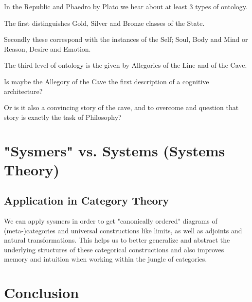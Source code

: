 \documentclass[12pt,a4paper]{article}
\begin{document}
In the Republic and Phaedro by Plato we hear about at least 3 types of ontology. 

The first distinguishes Gold, Silver and Bronze classes of the State.

Secondly these correspond with the instances of the Self; Soul, Body and Mind or Reason, Desire and Emotion.

The third level of ontology is the given by Allegories of the Line and of the Cave.

Is maybe the Allegory of the Cave the first description of a cognitive architecture?

Or is it also a convincing story of the cave, and to overcome and question that story is exactly the task of Philosophy? 
\section{"Sysmers" vs. Systems (Systems Theory)}

\subsection{Application in Category Theory}
We can apply sysmers in order to get "canonically ordered" diagrams of (meta-)categories and universal constructions like limits, as well as adjoints and natural transformations. This helps us to better generalize and abstract the underlying structures of these categorical constructions and also improves memory and intuition when working within the jungle of categories.


\section*{Conclusion}


\printbibliography
\end{document}
